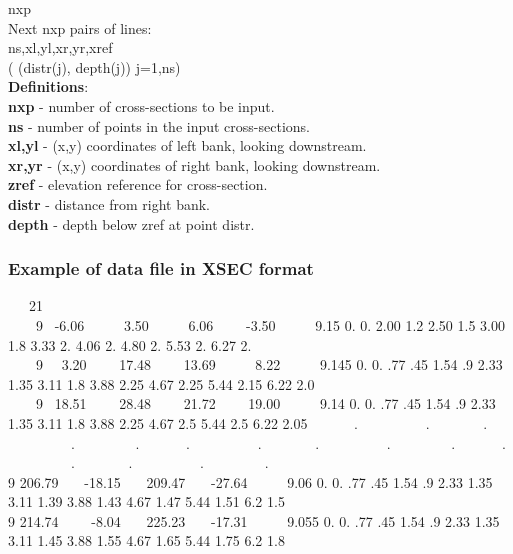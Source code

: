 \documentclass{article}
\begin{document}
\noindent
nxp\\
Next nxp pairs of lines:\\
ns,xl,yl,xr,yr,xref\\
( (distr(j), depth(j)) j=1,ns)\\


\noindent\textbf{Definitions}:\\ 

\noindent
\textbf{nxp} - number of cross-sections to be input.\\
\textbf{ns}   - number of points in the input cross-sections.\\
\textbf{xl,yl} - (x,y) coordinates of left bank, looking downstream.\\
\textbf{xr,yr} - (x,y) coordinates of right bank, looking downstream.\\
\textbf{zref} - elevation reference for cross-section.\\
\textbf{distr} - distance from right bank.\\
\textbf{depth} - depth below zref at point distr.\\

\subsubsection[Example of data file in XSEC format]{Example of data file in XSEC format}

\ \ \ 21\\ \ \ \ \ 9 \ {}-6.06 \ \ \ \ \ 3.50 \ \ \ \ \ 6.06 \ \ \ \ {}-3.50 \ \ \ \ \ 9.15 0. 0. 2.00 1.2 2.50 1.5 3.00 1.8 3.33 2. 4.06 2. 4.80 2. 5.53 2. 6.27 2.\\ \ \ \ \ 9 \ \ 3.20 \ \ \ \ 17.48 \ \ \ \ 13.69 \ \ \ \ \ 8.22 \ \ \ \ \ 9.145 0. 0. .77 .45 1.54 .9 2.33 1.35 3.11 1.8 3.88 2.25 4.67 2.25 5.44 2.15 6.22 2.0\\ \ \ \ \ 9 \ 18.51 \ \ \ \ 28.48 \ \ \ \ 21.72 \ \ \ \ 19.00 \ \ \ \ \ 9.14 0. 0. .77 .45 1.54 .9 2.33 1.35 3.11 1.8 3.88 2.25 4.67 2.5 5.44 2.5 6.22 2.05 \ \ \ \ \ \ . \ \ \ \ \ \ \ \ \ . \ \ \ \ \ \ \ . \ \ \ \ \ \ \ \ \ . \ \ \ \ \ \ \ \ . \ \ \ \ \ \ . \ \ \ \ \ \ \ \ \ . \ \ \ \ \ \ \ . \ \ \ \ \ \ \ \ \ . \ \ \ \ \ \ \ \ . \ \ \ \ \ \ . \ \ \ \ \ \ \ \ \ . \ \ \ \ \ \ \ . \ \ \ \ \ \ \ \ \ . \ \ \ \ \ \ \ \ . \ \ \ \ \\9 206.79 \ \ \ {}-18.15 \ \ \ 209.47 \ \ \ {}-27.64 \ \ \ \ \ 9.06 0. 0. .77 .45 1.54 .9 2.33 1.35 3.11 1.39 3.88 1.43 4.67 1.47 5.44 1.51 6.2 1.5 \\ 9 214.74 \ \ \ \ {}-8.04 \ \ \ 225.23 \ \ \ {}-17.31 \ \ \ \ \ 9.055 0. 0. .77 .45 1.54 .9 2.33 1.35 3.11 1.45 3.88 1.55 
4.67 1.65 5.44 1.75 6.2 1.8
\end{document}
